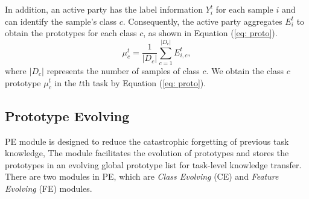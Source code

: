 In addition, an active party has the label information $Y_i^t$ for each sample $i$ and can identify the sample's class $c$. 
Consequently, the active party aggregates $E_{i}^t$ to obtain the prototypes for each class $c$, as shown in Equation (\ref{eq: proto}). 
\begin{equation} \label{eq: proto}
    \mu_{c}^{t}=\frac{1}{\left|D_{c}\right|} \sum_{c=1}^{\left|D_{c}\right|} E_{i,c}^t,
\end{equation}
where $|D_{c}|$ represents the number of samples of class $c$. 
We obtain the class $c$ prototype $\mu_{c}^t$ in the $t$th task by Equation (\ref{eq: proto}).

\subsection{Prototype Evolving}
PE module is designed to reduce the catastrophic forgetting of previous task knowledge, 
The module facilitates the evolution of prototypes and stores the prototypes in an evolving global prototype list for task-level knowledge transfer.
There are two modules in PE, which are \textit{Class Evolving} (CE) and \textit{Feature Evolving} (FE) modules.
%

